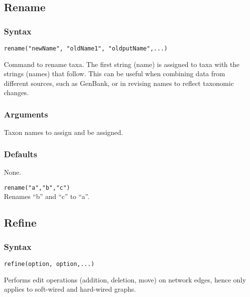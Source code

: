 \subsection{Rename}
	\subsubsection{Syntax}
		\texttt{rename("newName", "oldName1", "oldputName",...)}
		
	\begin{phygdescription}
	{Command to rename taxa. The first string (name) is assigned to taxa with the strings (names) 
	that follow. This can be useful when combining data from different sources, such as GenBank, 
	or in revising names to reflect taxonomic changes.}
	\end{phygdescription}
	
	\subsubsection{Arguments}
		Taxon names to assign and be assigned.
		
	\subsubsection{Defaults}
		None.
		
	\begin{example}
	
		\item{\texttt{rename("a","b","c")}\\ Renames ``b'' and ``c'' to ``a''. }
				
	\end{example}

\subsection{Refine}
	\subsubsection{Syntax}
		\texttt{refine(option, option,...)}
		
	\begin{phygdescription}
		{Performs edit operations (addition, deletion, move) on network edges, hence only applies to 
		soft-wired and hard-wired graphs.}
	\end{phygdescription}

